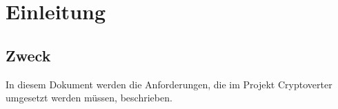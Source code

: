 \section{Einleitung}

\subsection{Zweck}
In diesem Dokument werden die Anforderungen, die im Projekt Cryptoverter umgesetzt werden müssen, beschrieben.
